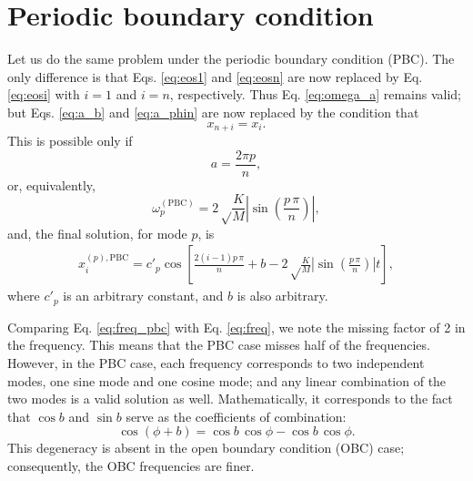 \documentclass[11pt]{article}
\begin{document}
\section{Periodic boundary condition}



Let us do the same problem under the periodic boundary condition (PBC).
%
The only difference is that Eqs. \eqref{eq:eos1} and \eqref{eq:eosn}
are now replaced by Eq. \eqref{eq:eosi}
with $i = 1$ and $i = n$, respectively.
%
Thus Eq. \eqref{eq:omega_a} remains valid;
but Eqs. \eqref{eq:a_b} and \eqref{eq:a_phin}
are now replaced by the condition that
\[
  x_{n+i} = x_i.
\]
This is possible only if
\begin{equation*}
  a = \frac{ 2 \pi p } { n },
\end{equation*}
or, equivalently,
\begin{equation}
\omega_p^\mathrm{(PBC)}
=
2 \sqrt \frac K M
\left|
\sin \left( \frac {p \, \pi} {n} \right)
\right|,
\label{eq:freq_pbc}
\end{equation}
%
and, the final solution, for mode $p$, is
\begin{align}
  x_i^{(p), \mathrm{PBC}}
=
  c'_p \cos\left[
  \frac{ 2 (i - 1) p \, \pi } { n }
  + b
  -2 \sqrt \frac K M
  \left|
  \sin \left( \frac {p \, \pi} {n} \right)
  \right| t
  \right],
  \label{eq:obcsol}
\end{align}
where $c'_p$ is an arbitrary constant,
and $b$ is also arbitrary.
%


Comparing Eq. \eqref{eq:freq_pbc} with Eq. \eqref{eq:freq},
we note the missing factor of 2 in the frequency.
%
This means that the PBC case misses
half of the frequencies.
%
However, in the PBC case,
each frequency corresponds to two independent modes,
one sine mode and one cosine mode;
and any linear combination of the two modes
is a valid solution as well.
%
Mathematically, it corresponds to the fact that
$\cos b$ and $\sin b$ serve as the coefficients of combination:
\[
  \cos(\phi + b) = \cos b \, \cos \phi - \cos b \, \cos \phi.
\]
This degeneracy is absent in the open boundary condition (OBC) case;
consequently, the OBC frequencies are finer.
\end{document}
